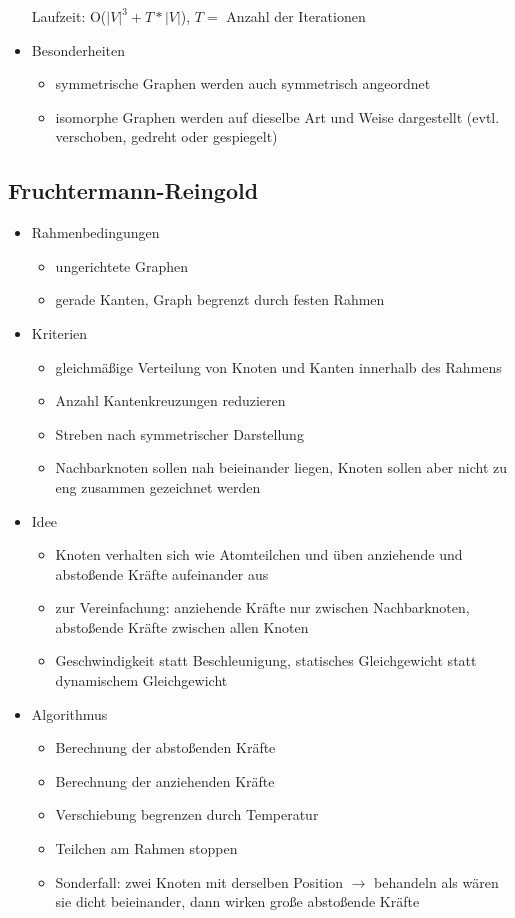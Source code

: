 \documentclass[a4paper,12pt,ngerman]{scrartcl}
\begin{document}
\begin{itemize}
    Laufzeit: O($|V|^3 + T * |V|$), $T =$ Anzahl der Iterationen

    \item Besonderheiten
    \begin{itemize}
        \item symmetrische Graphen werden auch symmetrisch angeordnet
        \item isomorphe Graphen werden auf dieselbe Art und Weise dargestellt (evtl. verschoben, gedreht oder gespiegelt)
    \end{itemize}
\end{itemize}


\subsection*{Fruchtermann-Reingold}
\begin{itemize}
    \item Rahmenbedingungen
    \begin{itemize}
        \item ungerichtete Graphen
        \item gerade Kanten, Graph begrenzt durch festen Rahmen
    \end{itemize}
    \item Kriterien
    \begin{itemize}
        \item gleichmäßige Verteilung von Knoten und Kanten innerhalb des Rahmens
        \item Anzahl Kantenkreuzungen reduzieren
        \item Streben nach symmetrischer Darstellung
        \item Nachbarknoten sollen nah beieinander liegen, Knoten sollen aber nicht zu eng zusammen gezeichnet werden
    \end{itemize}
    \item Idee
    \begin{itemize}
        \item Knoten verhalten sich wie Atomteilchen und üben anziehende und abstoßende Kräfte aufeinander aus
        \item zur Vereinfachung: anziehende Kräfte nur zwischen Nachbarknoten, abstoßende Kräfte zwischen allen Knoten
        \item Geschwindigkeit statt Beschleunigung, statisches Gleichgewicht statt dynamischem Gleichgewicht
    \end{itemize}
    \item Algorithmus
    \begin{itemize}
        \item Berechnung der abstoßenden Kräfte
        \item Berechnung der anziehenden Kräfte
        \item Verschiebung begrenzen durch Temperatur
        \item Teilchen am Rahmen stoppen
        \item Sonderfall: zwei Knoten mit derselben Position $\rightarrow$ behandeln als wären sie dicht beieinander, dann wirken große abstoßende Kräfte
    \end{itemize}


\end{itemize}
\end{document}
